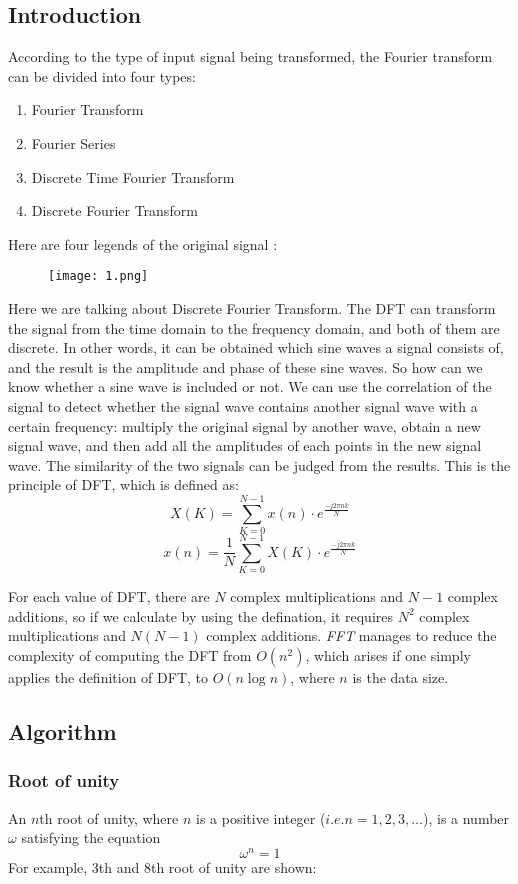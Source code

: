 \documentclass[12pt,a4paper]{article}
\begin{document}
\subsection{Introduction}
According to the type of input signal being transformed, the Fourier transform can be divided into four types:
\begin{enumerate}
\item Fourier Transform
\item Fourier Series
\item Discrete Time Fourier Transform
\item Discrete Fourier Transform
\end{enumerate}
Here are four legends of the  original signal :
\newpage
\begin{figure}[h]
\begin{center}
\texttt{[image: 1.png]} 
\end{center}
\end{figure}
Here we are talking about Discrete Fourier Transform. The DFT can transform the signal from the time domain to the frequency domain, and both of them are discrete. In other words, it can be obtained which sine waves a signal consists of, and the result is the amplitude and phase of these sine waves. So how can we know whether a sine wave is included or not. We can use the correlation of the signal to detect whether the signal wave contains another signal wave with a certain frequency: multiply the original signal by another wave, obtain a new signal wave, and then add all the amplitudes of each points in the new signal wave. The similarity of the two signals can be judged from the results. This is the principle of DFT, which is defined as:
$$X(K)=\sum^{N-1}_{K=0} x(n)\cdot e^{\frac{-j2\pi nk}{N}}$$
$$x(n)=\dfrac{1}{N} \sum^{N-1}_{K=0} X(K)\cdot e^{\frac{-j2\pi nk}{N}}$$

For each value of DFT, there are $N$ complex multiplications and $N-1$ complex additions, so if we calculate by using the defination, it requires $N^2$ complex multiplications and $N(N-1)$
complex additions. \textit{FFT} manages to reduce the complexity of computing the DFT from $O(n^{2})$, which arises if one simply applies the definition of DFT, to $O(n\log n)$, where $n$ is the data size.
\subsection{Algorithm}
\subsubsection{Root of unity}
An $n$th root of unity, where $n$ is a positive integer ($i.e. n=1, 2, 3, \ldots$), is a number $\omega$ satisfying the equation $$\omega^{n}=1$$
For example, 3th and 8th root of unity are shown:
\end{document}
